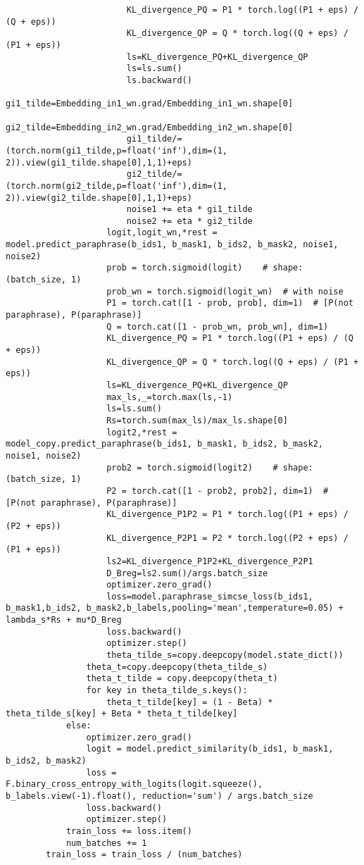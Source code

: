 \begin{lstlisting}
                        KL_divergence_PQ = P1 * torch.log((P1 + eps) / (Q + eps))
                        KL_divergence_QP = Q * torch.log((Q + eps) / (P1 + eps))
                        ls=KL_divergence_PQ+KL_divergence_QP
                        ls=ls.sum()
                        ls.backward()
                        gi1_tilde=Embedding_in1_wn.grad/Embedding_in1_wn.shape[0]
                        gi2_tilde=Embedding_in2_wn.grad/Embedding_in2_wn.shape[0]
                        gi1_tilde/=(torch.norm(gi1_tilde,p=float('inf'),dim=(1, 2)).view(gi1_tilde.shape[0],1,1)+eps)
                        gi2_tilde/=(torch.norm(gi2_tilde,p=float('inf'),dim=(1, 2)).view(gi2_tilde.shape[0],1,1)+eps)
                        noise1 += eta * gi1_tilde
                        noise2 += eta * gi2_tilde
                    logit,logit_wn,*rest = model.predict_paraphrase(b_ids1, b_mask1, b_ids2, b_mask2, noise1, noise2) 
                    prob = torch.sigmoid(logit)    # shape: (batch_size, 1)
                    prob_wn = torch.sigmoid(logit_wn)  # with noise
                    P1 = torch.cat([1 - prob, prob], dim=1)  # [P(not paraphrase), P(paraphrase)]
                    Q = torch.cat([1 - prob_wn, prob_wn], dim=1)
                    KL_divergence_PQ = P1 * torch.log((P1 + eps) / (Q + eps))
                    KL_divergence_QP = Q * torch.log((Q + eps) / (P1 + eps))
                    ls=KL_divergence_PQ+KL_divergence_QP
                    max_ls,_=torch.max(ls,-1)
                    ls=ls.sum()
                    Rs=torch.sum(max_ls)/max_ls.shape[0]
                    logit2,*rest = model_copy.predict_paraphrase(b_ids1, b_mask1, b_ids2, b_mask2, noise1, noise2)
                    prob2 = torch.sigmoid(logit2)    # shape: (batch_size, 1)
                    P2 = torch.cat([1 - prob2, prob2], dim=1)  # [P(not paraphrase), P(paraphrase)]
                    KL_divergence_P1P2 = P1 * torch.log((P1 + eps) / (P2 + eps))
                    KL_divergence_P2P1 = P2 * torch.log((P2 + eps) / (P1 + eps))
                    ls2=KL_divergence_P1P2+KL_divergence_P2P1
                    D_Breg=ls2.sum()/args.batch_size
                    optimizer.zero_grad()
                    loss=model.paraphrase_simcse_loss(b_ids1, b_mask1,b_ids2, b_mask2,b_labels,pooling='mean',temperature=0.05) + lambda_s*Rs + mu*D_Breg
                    loss.backward()
                    optimizer.step()
                    theta_tilde_s=copy.deepcopy(model.state_dict())
                theta_t=copy.deepcopy(theta_tilde_s)
                theta_t_tilde = copy.deepcopy(theta_t)
                for key in theta_tilde_s.keys():
                    theta_t_tilde[key] = (1 - Beta) * theta_tilde_s[key] + Beta * theta_t_tilde[key]
            else:
                optimizer.zero_grad()
                logit = model.predict_similarity(b_ids1, b_mask1, b_ids2, b_mask2)
                loss = F.binary_cross_entropy_with_logits(logit.squeeze(), b_labels.view(-1).float(), reduction='sum') / args.batch_size
                loss.backward()
                optimizer.step()
            train_loss += loss.item()
            num_batches += 1
        train_loss = train_loss / (num_batches)



\end{lstlisting}
